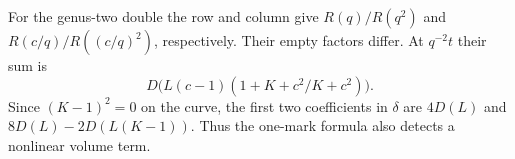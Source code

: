 For the genus-two double the row and column give
$R(q)/R(q^2)$ and $R(c/q)/R((c/q)^2)$, respectively. Their empty
factors differ. At $q^{-2}t$ their sum is
\[
 D\bigl(L(c-1)(1+K+c^2/K+c^2)\bigr).
\]
Since $(K-1)^2=0$ on the curve, the first two coefficients in
$\delta$ are $4D(L)$ and $8D(L)-2D(L(K-1))$.
Thus the one-mark formula also detects a nonlinear volume term.
